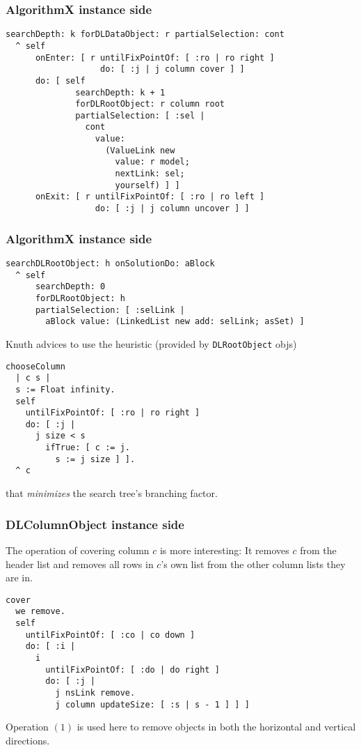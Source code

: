 \documentclass{beamer}
\begin{document}
\begin{frame}[fragile]
\frametitle{AlgorithmX instance side}
\begin{verbatim}
searchDepth: k forDLDataObject: r partialSelection: cont
  ^ self
      onEnter: [ r untilFixPointOf: [ :ro | ro right ] 
                   do: [ :j | j column cover ] ]
      do: [ self
              searchDepth: k + 1
              forDLRootObject: r column root
              partialSelection: [ :sel | 
                cont
                  value:
                    (ValueLink new
                      value: r model;
                      nextLink: sel;
                      yourself) ] ]
      onExit: [ r untilFixPointOf: [ :ro | ro left ] 
                  do: [ :j | j column uncover ] ]
\end{verbatim}
\end{frame}
  
\begin{frame}[fragile]
\frametitle{AlgorithmX instance side}
\begin{verbatim}
searchDLRootObject: h onSolutionDo: aBlock
  ^ self
      searchDepth: 0
      forDLRootObject: h
      partialSelection: [ :selLink | 
        aBlock value: (LinkedList new add: selLink; asSet) ]
\end{verbatim}
\vfill
Knuth advices to use the heuristic (provided by \texttt{DLRootObject} objs)
\begin{verbatim}
chooseColumn
  | c s |
  s := Float infinity.
  self
    untilFixPointOf: [ :ro | ro right ]
    do: [ :j | 
      j size < s
        ifTrue: [ c := j.
          s := j size ] ].
  ^ c
\end{verbatim}
that \textit{minimizes} the search tree's branching factor.
\end{frame}

\begin{frame}[fragile]
\frametitle{DLColumnObject instance side}
The operation of covering column $c$ is more interesting: 
It removes $c$ from the header list and removes all rows in $c$'s own list 
from the other column lists they are in.
\begin{verbatim}
cover
  we remove.
  self
    untilFixPointOf: [ :co | co down ]
    do: [ :i | 
      i
        untilFixPointOf: [ :do | do right ]
        do: [ :j | 
          j nsLink remove.
          j column updateSize: [ :s | s - 1 ] ] ]
\end{verbatim}
Operation $(1)$ is used here to remove objects in both the horizontal and vertical directions.
\end{frame}
\end{document}
